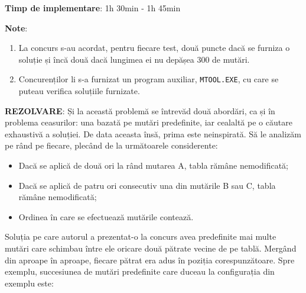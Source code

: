 {\bf Timp de implementare}: 1h 30min - 1h 45min

{\bf Note}:

\begin{enumerate}

\item La concurs s-au acordat, pentru fiecare test, două puncte dacă se
  furniza o soluție și încă două dacă lungimea ei nu depășea 300 de mutări.

\item Concurenților li s-a furnizat un program auxiliar, {\tt MTOOL.EXE}, cu
  care se puteau verifica soluțiile furnizate.

\end{enumerate}

{\bf REZOLVARE}: Și la această problemă se întrevăd două abordări, ca și în
problema ceasurilor: una bazată pe mutări predefinite, iar cealaltă pe o
căutare exhaustivă a soluției. De data aceasta însă, prima este
neinspirată. Să le analizăm pe rând pe fiecare, plecând de la următoarele
considerente:

\begin{itemize}

\item Dacă se aplică de două ori la rând mutarea A, tabla rămâne nemodificată;

\item Dacă se aplică de patru ori consecutiv una din mutările B sau C, tabla
  rămâne nemodificată;

\item Ordinea în care se efectuează mutările contează.

\end{itemize}

Soluția pe care autorul a prezentat-o la concurs avea predefinite mai multe
mutări care schimbau între ele oricare două pătrate vecine de pe
tablă. Mergând din aproape în aproape, fiecare pătrat era adus în poziția
corespunzătoare. Spre exemplu, succesiunea de mutări predefinite care duceau
la configurația din exemplu este:

